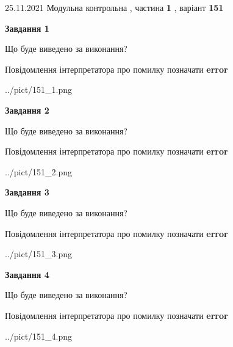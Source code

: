 \documentclass[10pt, ukrainian]{article}
\begin{document}
{25.11.2021 Модульна контрольна , частина \textbf { 1 }, варіант  \No \textbf { 151 }\par}
{
\begin {large}

{\begin {center}\textbf{Завдання 1}\end {center}}\par
Що буде виведено за виконання? \par
Повідомлення інтерпретатора про помилку позначати \textbf{error}

\begin{center}
	{../pict/151_1.png}
\end{center}
\newpage

{\begin {center}\textbf{Завдання 2}\end {center}}\par
Що буде виведено за виконання? \par
Повідомлення інтерпретатора про помилку позначати \textbf{error}

\begin{center}
	{../pict/151_2.png}
\end{center}
\newpage

{\begin {center}\textbf{Завдання 3}\end {center}}\par
Що буде виведено за виконання? \par
Повідомлення інтерпретатора про помилку позначати \textbf{error}

\begin{center}
	{../pict/151_3.png}
\end{center}
\newpage

{\begin {center}\textbf{Завдання 4}\end {center}}\par
Що буде виведено за виконання? \par
Повідомлення інтерпретатора про помилку позначати \textbf{error}

\begin{center}
	{../pict/151_4.png}
\end{center}
\newpage


\end{large}}
\end{document}
